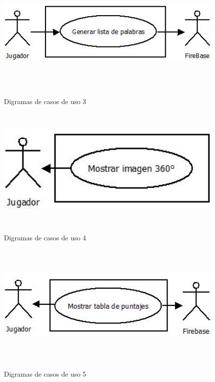 \begin{figure}[H]
	\centering
	{\includegraphics[width=12cm, height=6cm]{imgs/DiagramaCasoUso3.png}}
	\caption{Digramas de casos de uso 3}
\end{figure}
\begin{figure}[H]
	\centering
	{\includegraphics[width=12cm, height=6cm]{imgs/DiagramaCasoUso4.png}}
 	\caption{Digramas de casos de uso 4}
\end{figure}

\begin{figure}[H]
	\centering
	{\includegraphics[width=12cm, height=6cm]{imgs/DiagramaCasoUso5.png}}
 	\caption{Digramas de casos de uso 5}
\end{figure}

